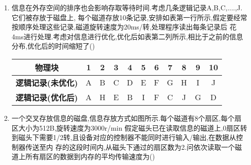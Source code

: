 \documentclass[12pt, a4paper, oneside, UTF8]{ctexbook}
\begin{document}
\begin{enumerate}
    \item 信息在外存空间的排序也会影响存取等待时间.考虑几条逻辑记录A,B,C,....,J.它们被存放于磁盘上,
    每个磁道存放10条记录,安排如表第一行所示,假定要经常按顺序处理这些记录,磁道旋转速度为20ms/转,处理程序读出每条记录后
    花4ms进行处理.考虑对信息进行优化,优化后如表第二列所示,相比于之前的信息分布,优化后的时间缩短了(\qquad)
    \begin{center}
    \begin{tabular}{|c|c|c|c|c|c|c|c|c|c|c|}
    \hline
    \textbf{物理块} & 1 & 2 & 3 & 4 & 5 & 6 & 7 & 8 & 9 & 10 \\ \hline 
    \textbf{逻辑记录(未优化)} & A & B & C & D & E & F & G & H & I & J \\ \hline 
    \textbf{逻辑记录(优化后)} & A & H & E & B & I & F & C & J & G & D \\ \hline 
    \end{tabular}
    \end{center}
    
    \item 一个交叉存放信息的磁盘,信息存放方式如图所示.每个磁道有8个扇区,每个扇区大小为512B,旋转速度为3000r/min
    假定磁头已在读取信息的磁道上,0扇区转到磁头下需要1/2转,且设备对应的控制器不能同时进行输入/输出,在数据从控制器传送至内
    存的这段时间内,从磁头下通过的扇区数为2.问依次读取一个磁道上所有扇区的数据到内存的平均传输速度为(\qquad)
    \begin{center}
    \end{center}
\end{enumerate}

\ifx\allfiles\undefined
\end{document}
